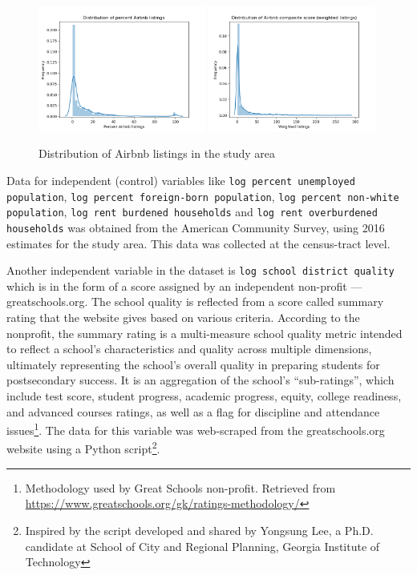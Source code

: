 \documentclass[10pt,letterpaper,onecolumn]{article}
\begin{document}
\begin{figure}[H]
  \centering
  \includegraphics[width=0.49\textwidth]{Airbnb_listings_distribution.png}
  \includegraphics[width=0.49\textwidth]{Composite_score_distribution.png}
  \caption{Distribution of Airbnb listings in the study area}
\end{figure}

Data for independent (control) variables like \texttt{log percent unemployed population}, \texttt{log percent foreign-born population}, \texttt{log percent
non-white population}, \texttt{log rent burdened households} and \texttt{log rent
overburdened households} was obtained from the American Community
Survey, using 2016 estimates for the study area. This data was collected
at the census-tract level.

Another independent variable in the dataset is \texttt{log school district
quality} which is in the form of a score assigned by an independent
non-profit --- greatschools.org. The school quality is reflected from a
score called summary rating that the website gives based on various
criteria. According to the nonprofit, the summary rating is a
multi-measure school quality metric intended to reflect a school's
characteristics and quality across multiple dimensions, ultimately
representing the school's overall quality in preparing students for
postsecondary success. It is an aggregation of the school's
``sub-ratings'', which include test score, student progress, academic
progress, equity, college readiness, and advanced courses ratings, as
well as a flag for discipline and attendance issues\footnote{Methodology
used by Great Schools non-profit. Retrieved from
\url{https://www.greatschools.org/gk/ratings-methodology/}}. The data
for this variable was web-scraped from the greatschools.org website
using a Python script\footnote{Inspired by the script developed and
shared by Yongsung Lee, a Ph.D. candidate at School of City and
Regional Planning, Georgia Institute of Technology}.
\end{document}
